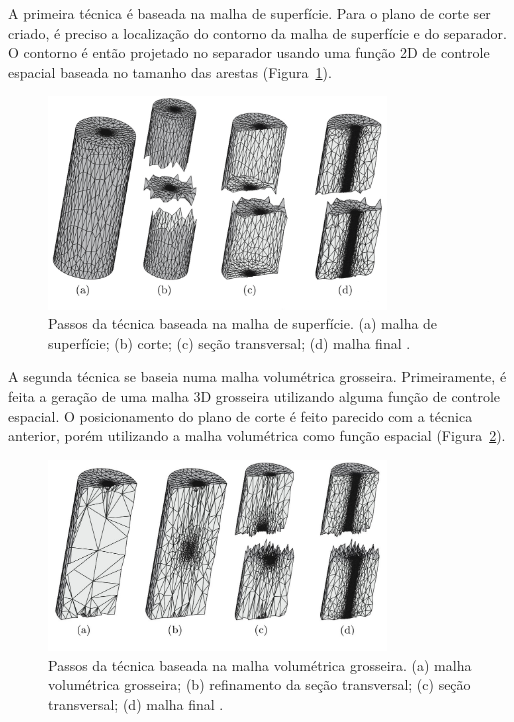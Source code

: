 A primeira técnica é baseada na malha de superfície. Para o plano de corte ser criado, é preciso a localização do contorno da malha de superfície e do separador. O contorno é então projetado no separador usando uma função 2D de controle espacial baseada no tamanho das arestas (Figura~\ref{fig:glut08_1}).

 \begin{figure}[htbp]
     \centering
     \includegraphics[width=0.8\textwidth]{fig/glut08_1.jpg}
     \caption{Passos da técnica baseada na malha de superfície. (a) malha de superfície; (b) corte; (c) seção transversal; (d) malha final \cite{bib:Glut08}.}
     \label{fig:glut08_1}
 \end{figure}

A segunda técnica se baseia numa malha volumétrica grosseira. Primeiramente, é feita a geração de uma malha 3D grosseira utilizando alguma função de controle espacial. O posicionamento do plano de corte é feito parecido com a técnica anterior, porém utilizando a malha volumétrica como função espacial (Figura~\ref{fig:glut08_2}).

 \begin{figure}[!ht]
     \centering
     \includegraphics[width=0.8\textwidth]{fig/glut08_2.jpg}
     \caption{Passos da técnica baseada na malha volumétrica grosseira. (a) malha volumétrica grosseira; (b) refinamento da seção transversal; (c) seção transversal; (d) malha final \cite{bib:Glut08}.}
     \label{fig:glut08_2}
 \end{figure}


